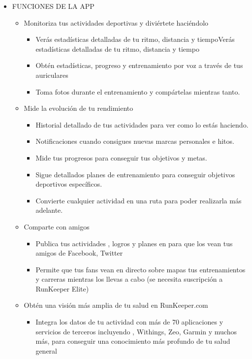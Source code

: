 \documentclass[a4paper, 11pt]{article}
\begin{document}
                  \begin{itemize}
                    \item{FUNCIONES DE LA APP}
                    \begin{itemize}
                      \item {Monitoriza tus actividades deportivas y diviértete haciéndolo}
                      \begin{itemize}
                        \item {Verás estadísticas detalladas de tu ritmo, distancia y tiempoVerás estadísticas detalladas de tu ritmo, distancia y tiempo}
                        \item {Obtén estadísticas, progreso y entrenamiento por voz a través de tus auriculares}
                        \item {Toma fotos durante el entrenamiento y compártelas mientras tanto.}
                      \end{itemize}
                      \item {Mide la evolución de tu rendimiento}
                      \begin{itemize}
                        \item {Historial detallado de tus actividades para ver como lo estás haciendo.}
                        \item {Notificaciones cuando consigues nuevas marcas personales e hitos.}
                        \item {Mide tus progresos para conseguir tus objetivos y metas.}
                        \item {Sigue detallados planes de entrenamiento para conseguir objetivos deportivos específicos.}
                        \item {Convierte cualquier actividad en una ruta para poder realizarla más adelante.}
                      \end{itemize}
                      \item {Comparte con amigos}
                      \begin{itemize}
                        \item {Publica tus actividades , logros y planes en para que los vean tus amigos de Facebook, Twitter}
                        \item {Permite que tus fans vean en directo sobre mapas tus entrenamientos y carreras mientras los llevas a cabo (se necesita suscripción a RunKeeper Elite)}
                      \end{itemize}
                      \item {Obtén una visión más amplia de tu salud en RunKeeper.com}
                      \begin{itemize}
                        \item {Integra los datos de tu actividad con más de 70 aplicaciones y servicios de terceros incluyendo , Withings, Zeo, Garmin y muchos más, para conseguir una conocimiento más profundo de tu salud general}
                      \end{itemize}
                    \end{itemize}

\end{itemize}
\end{document}
